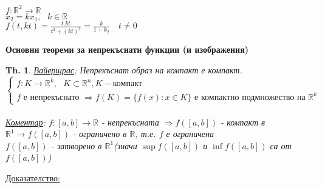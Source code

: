 \documentclass[12pt]{article}
\newtheorem{theorem}{Th.}
\newcommand{\spc}{\text{ }}
\begin{document}
	$f:\mathbb{R}^2\rightarrow\mathbb{R}$\\
	$x_2 = kx_1,\spc k\in\mathbb{R}$\\
	$f(t,kt)=\frac{t.kt}{t^2+(kt)^2}=\frac{k}{1+k_2}\quad t\neq0$\\
	\newpage
	\begin{center}
		\textbf{Основни теореми за непрекъснати функции (и изображения)}
	\end{center}
	\begin{theorem}
		\underline{Вайерщрас}: Непрекъснат образ на компакт е компакт.\\
		$\begin{cases}
			f: K\rightarrow\mathbb{R}^k,\spc K\subset\mathbb{R}^n, K-\text{компакт}\\
			f \text{ е непрекъснато }\Rightarrow f(K) = \{f(x):x\in K\} \text{ е компактно подмножество на }\mathbb{R}^k
		\end{cases}$\\
		\\
		\underline{Коментар}: $f:[a,b]\rightarrow \mathbb{R}$ - непрекъсната $\Rightarrow f([a,b])$ - компакт в $\mathbb{R}^1\rightarrow f([a,b])$ - ограничено в $\mathbb{R}$, т.е. $f$ е ограничена\\
		$f([a,b])$ - затворено в $\mathbb{R}^1$(значи $\sup f([a,b])$ и $\inf f([a,b])$ са от $f([a,b])$)	
	\end{theorem}
	\underline{Доказателство:}
\end{document}
